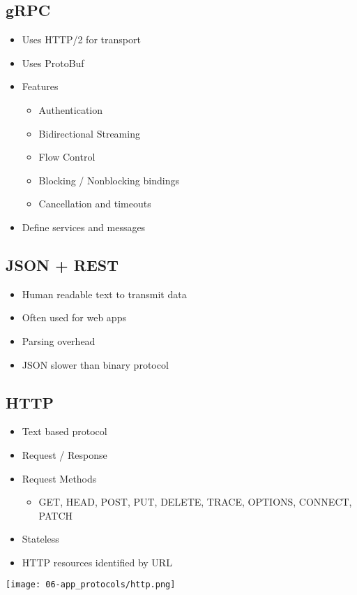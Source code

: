 \subsection{gRPC}
\begin{itemize}
    \item Uses HTTP/2 for transport
    \item Uses ProtoBuf
    \item Features
    \begin{itemize}
        \item Authentication
        \item Bidirectional Streaming
        \item Flow Control
        \item Blocking / Nonblocking bindings
        \item Cancellation and timeouts
    \end{itemize}
    \item Define services and messages
\end{itemize}

\subsection{JSON + REST}
\begin{itemize}
    \item Human readable text to transmit data
    \item Often used for web apps
    \item Parsing overhead
    \item JSON slower than binary protocol
\end{itemize}

\subsection{HTTP}
\begin{itemize}
    \item Text based protocol
    \item Request / Response
    \item Request Methods
    \begin{itemize}
        \item GET, HEAD, POST, PUT, DELETE, TRACE, OPTIONS, CONNECT, PATCH
    \end{itemize}
    \item Stateless
    \item HTTP resources identified by URL
\end{itemize}
\vspace{-8pt}
\begin{center}
    \texttt{[image: 06-app\_protocols/http.png]}    
\end{center}


